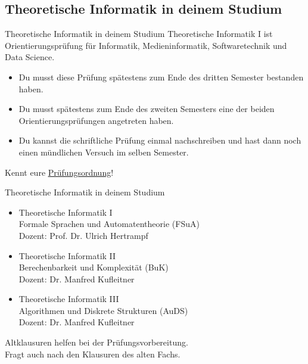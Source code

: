 \subsection{Theoretische Informatik in deinem Studium}
\begin{frame}[fragile]{Theoretische Informatik in deinem Studium}
Theoretische Informatik I ist Orientierungsprüfung für Informatik, Medieninformatik, Softwaretechnik und Data Science.
    \begin{itemize} 
    \item Du musst diese Prüfung spätestens zum Ende des dritten Semester bestanden haben.
    \item Du musst spätestens zum Ende des zweiten Semesters eine der beiden Orientierungsprüfungen angetreten haben.
    \item Du kannst die schriftliche Prüfung einmal nachschreiben und hast dann noch einen mündlichen Versuch im selben Semester.
    \end{itemize}
    \alert{Kennt eure \href{https://www.student.uni-stuttgart.de/pruefungsorganisation/pruefungsordnung/}{\underline{Prüfungsordnung}}!}
\end{frame}

\begin{frame}{Theoretische Informatik in deinem Studium}
    \begin{itemize}
        \item Theoretische Informatik I\\
        Formale Sprachen und Automatentheorie (FSuA)\\
        \quad Dozent: Prof. Dr. Ulrich Hertrampf
        \item Theoretische Informatik II\\
        Berechenbarkeit und Komplexität (BuK)\\
        \quad Dozent: Dr. Manfred Kufleitner
        \item Theoretische Informatik III\\
        Algorithmen und Diskrete Strukturen (AuDS)\\
        \quad Dozent: Dr. Manfred Kufleitner
    \end{itemize}
	\alert{Altklausuren helfen bei der Prüfungsvorbereitung. \\Fragt auch nach den Klausuren des alten Fachs.}
\end{frame}


